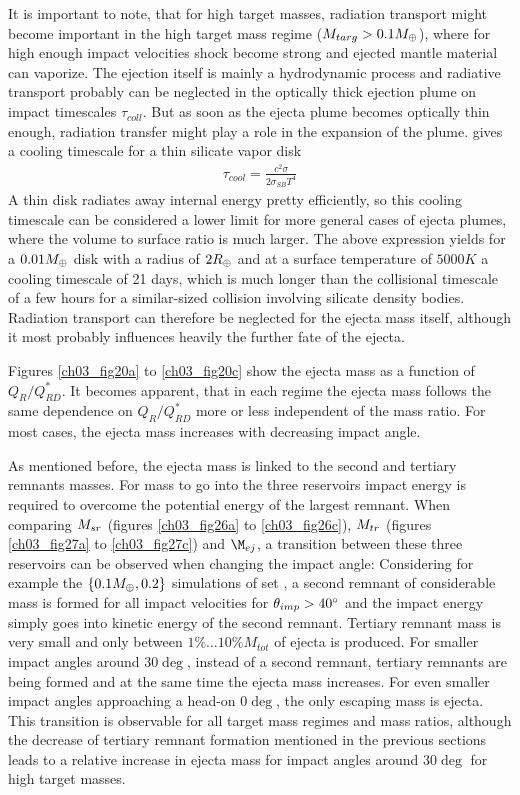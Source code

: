 It is important to note, that for high target masses, radiation transport might become important in the high target mass regime ($M_{targ} > 0.1 M_{\oplus}$), where for high enough impact velocities shock become strong and ejected mantle material can vaporize. The ejection itself is mainly a hydrodynamic process and radiative transport probably can be neglected in the optically thick ejection plume on impact timescales $\tau_{coll}$. But as soon as the ejecta plume becomes optically thin enough, radiation transfer might play a role in the expansion of the plume. \cite{Thompson:1988p3451} gives a cooling timescale for a thin silicate vapor disk 
\begin{align}
\tau_{cool} = \frac{c^2 \sigma}{ 2 \sigma_{SB} T^4}
\end{align}
A thin disk radiates away internal energy pretty efficiently, so this cooling timescale can be considered a lower limit for more general cases of ejecta plumes, where the volume to surface ratio is much larger. The above expression yields for a $0.01 M_{\oplus}$ disk with a radius of $2 R_{\oplus}$ and at a surface temperature of $5000K$ a cooling timescale of 21 days, which is much longer than the collisional timescale of a few hours for a similar-sized collision involving silicate density bodies. Radiation transport can therefore be neglected for the ejecta mass itself, although it most probably influences heavily the further fate of the ejecta.

Figures \ref{ch03_fig20a} to \ref{ch03_fig20c} show the ejecta mass as a function of $Q_{R} / Q_{RD}^*$. It becomes apparent, that in each regime the ejecta mass follows the same dependence on $Q_{R} / Q_{RD}^*$ more or less independent of the mass ratio. For most cases, the ejecta mass increases with decreasing impact angle. 

As mentioned before, the ejecta mass is linked to the second and tertiary remnants masses. For mass to go into the three reservoirs impact energy is required to overcome the potential energy of the largest remnant. When comparing $M_{sr}$ (figures \ref{ch03_fig26a} to \ref{ch03_fig26c}), $M_{tr}$ (figures \ref{ch03_fig27a} to \ref{ch03_fig27c}) and $\M_{ej}$, a transition between these three reservoirs can be observed when changing the impact angle: Considering for example the $\{ 0.1M_{\oplus}, 0.2 \}$ simulations of set \css, a second remnant of considerable mass is formed for all impact velocities for $\theta_{imp} > 40 ^\circ$ and the impact energy simply goes into kinetic energy of the second remnant. Tertiary remnant mass is very small and only between $1 \% \dots 10\% M_{tot}$ of ejecta is produced. For smaller impact angles around $30 \deg$, instead of a second remnant, tertiary remnants are being formed and at the same time the ejecta mass increases. For even smaller impact angles approaching a head-on $0 \deg$, the only escaping mass is ejecta. This transition is observable for all target mass regimes and mass ratios, although the decrease of tertiary remnant formation mentioned in the previous sections leads to a relative increase in ejecta mass for impact angles around $30 \deg$ for high target masses.

